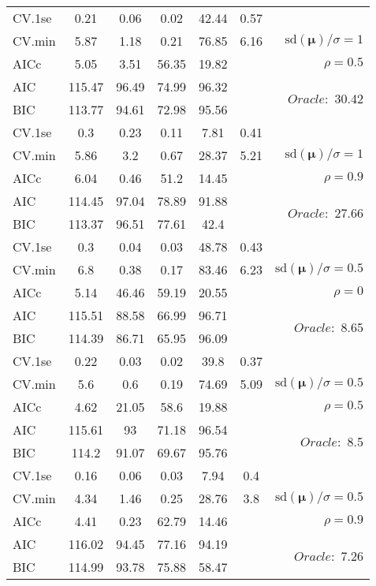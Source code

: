 \begin{table}
\begin{center}
\begin{tabular}{l*{5}{c}|r}
 \hline 
CV.1se & 0.21 & 0.06 & 0.02 & 42.44 & 0.57 & \\
CV.min & 5.87 & 1.18 & 0.21 & 76.85 & 6.16 &  $\mathrm{sd}(\mathbf{\mu})/\sigma=1$ \\
AICc & 5.05 & 3.51 & 56.35 & 19.82 & & $\rho=0.5$ \\
AIC & 115.47 & 96.49 & 74.99 & 96.32 & &  \multirow{2}{*}{$Oracle: $ 30.42} \\
BIC & 113.77 & 94.61 & 72.98 & 95.56 & &  \\
 \hline 
CV.1se & 0.3 & 0.23 & 0.11 & 7.81 & 0.41 & \\
CV.min & 5.86 & 3.2 & 0.67 & 28.37 & 5.21 &  $\mathrm{sd}(\mathbf{\mu})/\sigma=1$ \\
AICc & 6.04 & 0.46 & 51.2 & 14.45 & & $\rho=0.9$ \\
AIC & 114.45 & 97.04 & 78.89 & 91.88 & &  \multirow{2}{*}{$Oracle: $ 27.66} \\
BIC & 113.37 & 96.51 & 77.61 & 42.4 & &  \\
 \hline 
CV.1se & 0.3 & 0.04 & 0.03 & 48.78 & 0.43 & \\
CV.min & 6.8 & 0.38 & 0.17 & 83.46 & 6.23 &  $\mathrm{sd}(\mathbf{\mu})/\sigma=0.5$ \\
AICc & 5.14 & 46.46 & 59.19 & 20.55 & & $\rho=0$ \\
AIC & 115.51 & 88.58 & 66.99 & 96.71 & &  \multirow{2}{*}{$Oracle: $ 8.65} \\
BIC & 114.39 & 86.71 & 65.95 & 96.09 & &  \\
 \hline 
CV.1se & 0.22 & 0.03 & 0.02 & 39.8 & 0.37 & \\
CV.min & 5.6 & 0.6 & 0.19 & 74.69 & 5.09 &  $\mathrm{sd}(\mathbf{\mu})/\sigma=0.5$ \\
AICc & 4.62 & 21.05 & 58.6 & 19.88 & & $\rho=0.5$ \\
AIC & 115.61 & 93 & 71.18 & 96.54 & &  \multirow{2}{*}{$Oracle: $ 8.5} \\
BIC & 114.2 & 91.07 & 69.67 & 95.76 & &  \\
 \hline 
CV.1se & 0.16 & 0.06 & 0.03 & 7.94 & 0.4 & \\
CV.min & 4.34 & 1.46 & 0.25 & 28.76 & 3.8 &  $\mathrm{sd}(\mathbf{\mu})/\sigma=0.5$ \\
AICc & 4.41 & 0.23 & 62.79 & 14.46 & & $\rho=0.9$ \\
AIC & 116.02 & 94.45 & 77.16 & 94.19 & &  \multirow{2}{*}{$Oracle: $ 7.26} \\
BIC & 114.99 & 93.78 & 75.88 & 58.47 & &  \\
 \hline 
\end{tabular}
\end{center}
\vspace{-1cm}
\end{table}





